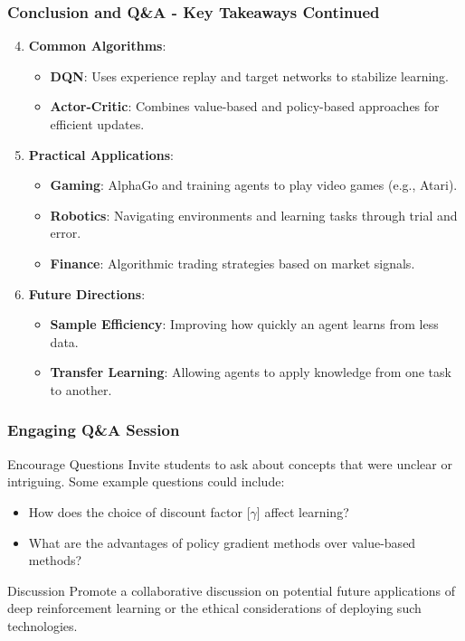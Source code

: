 \documentclass[aspectratio=169]{beamer}
\begin{document}
\begin{frame}[fragile]
    \frametitle{Conclusion and Q\&A - Key Takeaways Continued}
    \begin{enumerate}
        \setcounter{enumi}{3} %
        \item \textbf{Common Algorithms}:
        \begin{itemize}
            \item \textbf{DQN}: Uses experience replay and target networks to stabilize learning.
            \item \textbf{Actor-Critic}: Combines value-based and policy-based approaches for efficient updates.
        \end{itemize}
        
        \item \textbf{Practical Applications}:
        \begin{itemize}
            \item \textbf{Gaming}: AlphaGo and training agents to play video games (e.g., Atari).
            \item \textbf{Robotics}: Navigating environments and learning tasks through trial and error.
            \item \textbf{Finance}: Algorithmic trading strategies based on market signals.
        \end{itemize}
        
        \item \textbf{Future Directions}:
        \begin{itemize}
            \item \textbf{Sample Efficiency}: Improving how quickly an agent learns from less data.
            \item \textbf{Transfer Learning}: Allowing agents to apply knowledge from one task to another.
        \end{itemize}
    \end{enumerate}
\end{frame}

\begin{frame}[fragile]
    \frametitle{Engaging Q\&A Session}
    \begin{block}{Encourage Questions}
        Invite students to ask about concepts that were unclear or intriguing. Some example questions could include:
        \begin{itemize}
            \item How does the choice of discount factor [$\gamma$] affect learning?
            \item What are the advantages of policy gradient methods over value-based methods?
        \end{itemize}
    \end{block}
    
    \begin{block}{Discussion}
        Promote a collaborative discussion on potential future applications of deep reinforcement learning or the ethical considerations of deploying such technologies.
    \end{block}
\end{frame}
\end{document}
